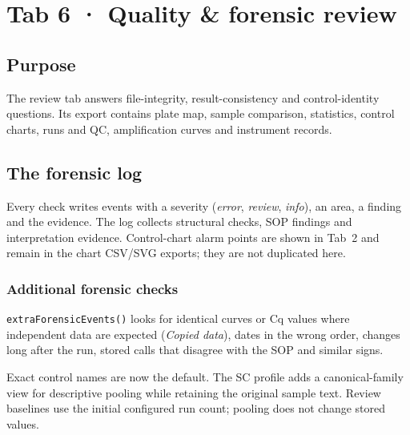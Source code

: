 \chapter{Tab 6 · Quality \& forensic review}\label{ch:review}

\section{Purpose}
The review tab answers file-integrity, result-consistency and control-identity questions. Its export contains plate map,
sample comparison, statistics, control charts, runs and QC, amplification curves and instrument records.


\section{The forensic log}
Every check writes events with a severity (\emph{error}, \emph{review}, \emph{info}), an area, a finding and the evidence.
The log collects structural checks, SOP findings and interpretation evidence. Control-chart alarm points are shown in Tab~2
and remain in the chart CSV/SVG exports; they are not duplicated here.





\subsection*{Additional forensic checks}
\texttt{extraForensicEvents()} looks for identical curves or Cq values where independent data are expected (\emph{Copied data}),
dates in the wrong order, changes long after the run, stored calls that disagree with the SOP and similar signs.




Exact control names are now the default. The SC profile adds a canonical-family view for descriptive pooling while retaining
the original sample text. Review baselines use the initial configured run count; pooling does not change stored values.

